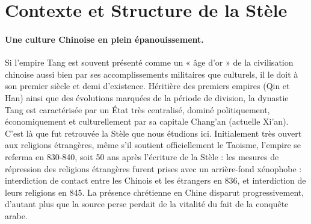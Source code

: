 \section{Contexte et Structure de la Stèle}
 \paragraph{Une culture Chinoise en plein épanouissement.} Si l'empire Tang est souvent présenté comme un « âge d'or » de la civilisation chinoise aussi bien par ses accomplissements militaires que culturels, il le doit à son premier siècle et demi d'existence. Héritière des premiers empires (Qin et Han) ainsi que des évolutions marquées de la période de division, la dynastie Tang est caractérisée par un État très centralisé, dominé politiquement, économiquement et culturellement par sa capitale Chang'an (actuelle Xi'an). C'est là que fut retrouvée la Stèle que nous étudions ici.  
 Initialement très ouvert aux religions étrangères, même s'il soutient officiellement le Taoisme, l'empire se referma en 830-840, soit 50 ans après l'écriture de la Stèle : les mesures de répression des religions étrangères furent prises avec un arrière-fond xénophobe : interdiction de contact entre les Chinois et les étrangers en 836, et interdiction de leurs religions en 845. La présence chrétienne en Chine disparut progressivement, d'autant plus que la source perse perdait de la vitalité du fait de la conquête arabe.
 
